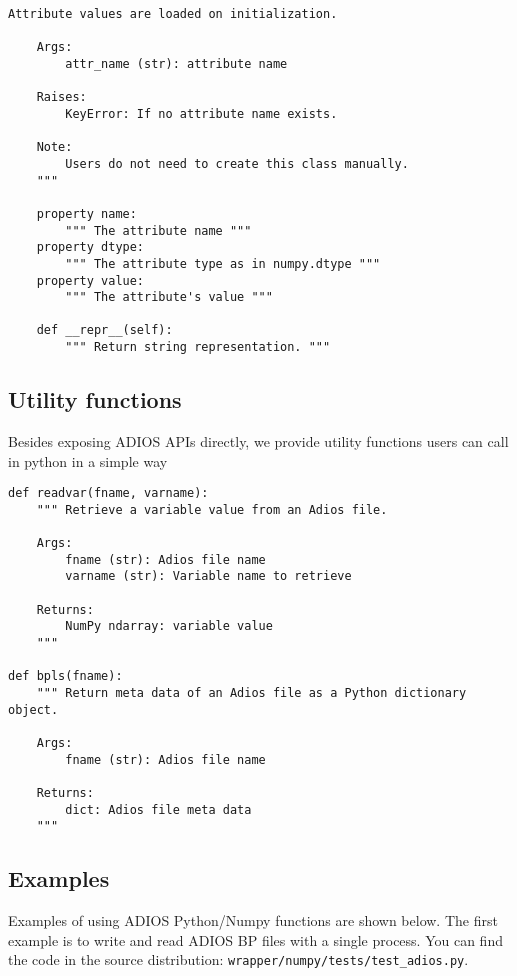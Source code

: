 \begin{lstlisting}[language=cython,caption={Read functions},label={},]
    Attribute values are loaded on initialization.

    Args:
        attr_name (str): attribute name

    Raises:
        KeyError: If no attribute name exists.

    Note:
        Users do not need to create this class manually.        
    """

    property name:
        """ The attribute name """
    property dtype:
        """ The attribute type as in numpy.dtype """
    property value:
        """ The attribute's value """

    def __repr__(self):
        """ Return string representation. """
\end{lstlisting}

\subsection{Utility functions}
Besides exposing ADIOS APIs directly, we provide utility functions users can call in python in a simple way

\begin{lstlisting}[language=cython,caption={Utility functions},label={},]
def readvar(fname, varname):
    """ Retrieve a variable value from an Adios file.

    Args:
        fname (str): Adios file name
        varname (str): Variable name to retrieve

    Returns:
        NumPy ndarray: variable value
    """

def bpls(fname):
    """ Return meta data of an Adios file as a Python dictionary object.

    Args:
        fname (str): Adios file name

    Returns:
        dict: Adios file meta data
    """
\end{lstlisting}

\subsection{Examples}
Examples of using ADIOS Python/Numpy functions are shown below. The first example is to write and read ADIOS BP files with a single process. You can find the code in the source distribution: \verb+wrapper/numpy/tests/test_adios.py+.

